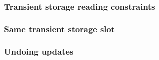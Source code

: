 \subsubsection{Transient storage reading constraints \lispTodo{}}    \label{hub: transient storage: specialized: reading}             
\subsubsection{Same transient storage slot           \lispTodo{}}    \label{hub: transient storage: specialized: same slot}          
\subsubsection{Undoing updates                       \lispTodo{}}    \label{hub: transient storage: specialized: undoing}            

